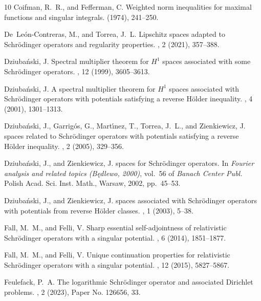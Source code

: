 \documentclass[10pt, a4paper, reqno]{amsart}
\theoremstyle{definition}
\theoremstyle{remark}
\numberwithin{equation}{section}
\begin{document}
\begin{thebibliography}{10}
{\sc Coifman, R.~R., and Fefferman, C.}
\newblock Weighted norm inequalities for maximal functions and singular integrals.
 (1974), 241--250.

{\sc De~Le\'{o}n-Contreras, M., and Torrea, J.~L.}
\newblock Lipschitz spaces adapted to {S}chr\"{o}dinger operators and regularity properties.
, 2 (2021), 357--388.

{\sc Dziuba\'{n}ski, J.}
\newblock Spectral multiplier theorem for {$H^1$} spaces associated with some {S}chr\"{o}dinger operators.
, 12 (1999), 3605--3613.

{\sc Dziuba\'{n}ski, J.}
\newblock A spectral multiplier theorem for {$H^1$} spaces associated with {S}chr\"{o}dinger operators with potentials satisfying a reverse {H}\"{o}lder inequality.
, 4 (2001), 1301--1313.

{\sc Dziuba\'{n}ski, J., Garrig\'{o}s, G., Mart\'{\i}nez, T., Torrea, J.~L., and Zienkiewicz, J.}
 spaces related to {S}chr\"{o}dinger operators with potentials satisfying a reverse {H}\"{o}lder inequality.
, 2 (2005), 329--356.

{\sc Dziuba\'{n}ski, J., and Zienkiewicz, J.}
 spaces for {S}chr\"{o}dinger operators.
\newblock In {\em Fourier analysis and related topics ({B}\k{e}dlewo, 2000)}, vol.~56 of {\em Banach Center Publ.} Polish Acad. Sci. Inst. Math., Warsaw, 2002, pp.~45--53.

{\sc Dziuba\'{n}ski, J., and Zienkiewicz, J.}
 spaces associated with {S}chr\"{o}dinger operators with potentials from reverse {H}\"{o}lder classes.
, 1 (2003), 5--38.

{\sc Fall, M.~M., and Felli, V.}
\newblock Sharp essential self-adjointness of relativistic {S}chr\"{o}dinger operators with a singular potential.
, 6 (2014), 1851--1877.

{\sc Fall, M.~M., and Felli, V.}
\newblock Unique continuation properties for relativistic {S}chr\"{o}dinger operators with a singular potential.
, 12 (2015), 5827--5867.

{\sc Feulefack, P.~A.}
\newblock The logarithmic {S}chr\"{o}dinger operator and associated {D}irichlet problems.
, 2 (2023), Paper No. 126656, 33.


\end{thebibliography}
\end{document}
